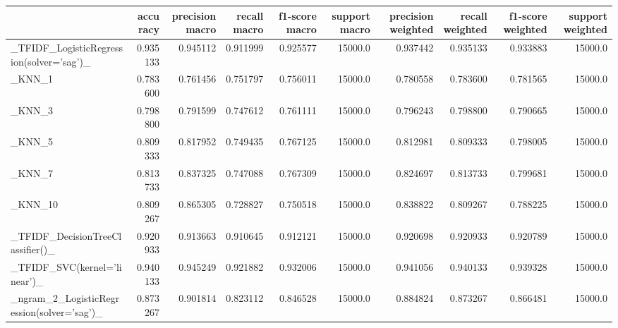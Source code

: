\begin{tabular}{lrrrrrrrrr}
\toprule
{} &  accuracy &  precision macro &  recall macro &  f1-score macro &  support macro &  precision weighted &  recall weighted &  f1-score weighted &  support weighted \\
\midrule
\_TFIDF\_LogisticRegression(solver='sag')\_           &  0.935133 &         0.945112 &      0.911999 &        0.925577 &        15000.0 &            0.937442 &         0.935133 &           0.933883 &           15000.0 \\
\_KNN\_1                                             &  0.783600 &         0.761456 &      0.751797 &        0.756011 &        15000.0 &            0.780558 &         0.783600 &           0.781565 &           15000.0 \\
\_KNN\_3                                             &  0.798800 &         0.791599 &      0.747612 &        0.761111 &        15000.0 &            0.796243 &         0.798800 &           0.790665 &           15000.0 \\
\_KNN\_5                                             &  0.809333 &         0.817952 &      0.749435 &        0.767125 &        15000.0 &            0.812981 &         0.809333 &           0.798005 &           15000.0 \\
\_KNN\_7                                             &  0.813733 &         0.837325 &      0.747088 &        0.767309 &        15000.0 &            0.824697 &         0.813733 &           0.799681 &           15000.0 \\
\_KNN\_10                                            &  0.809267 &         0.865305 &      0.728827 &        0.750518 &        15000.0 &            0.838822 &         0.809267 &           0.788225 &           15000.0 \\
\_TFIDF\_DecisionTreeClassifier()\_                   &  0.920933 &         0.913663 &      0.910645 &        0.912121 &        15000.0 &            0.920698 &         0.920933 &           0.920789 &           15000.0 \\
\_TFIDF\_SVC(kernel='linear')\_                       &  0.940133 &         0.945249 &      0.921882 &        0.932006 &        15000.0 &            0.941056 &         0.940133 &           0.939328 &           15000.0 \\
\_ngram\_2\_LogisticRegression(solver='sag')\_         &  0.873267 &         0.901814 &      0.823112 &        0.846528 &        15000.0 &            0.884824 &         0.873267 &           0.866481 &           15000.0 \\

\end{tabular}
